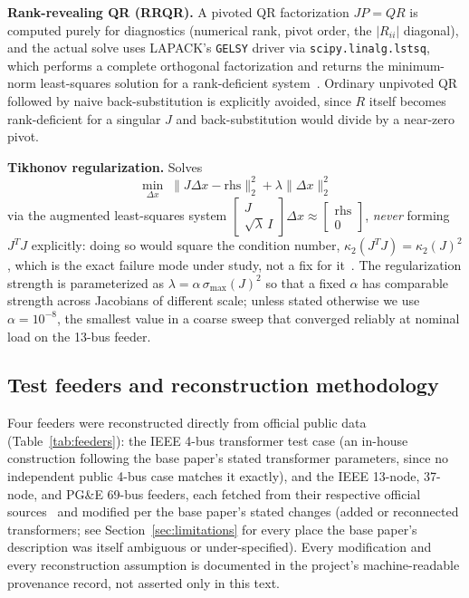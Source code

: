 \documentclass[conference]{IEEEtran}
\begin{document}
\textbf{Rank-revealing QR (RRQR).} A pivoted QR factorization $JP = QR$ is
computed purely for diagnostics (numerical rank, pivot order, the
$|R_{ii}|$ diagonal), and the actual solve uses LAPACK's \texttt{GELSY}
driver via \texttt{scipy.linalg.lstsq}, which performs a complete
orthogonal factorization and returns the minimum-norm least-squares
solution for a rank-deficient system~\cite{chan1987rank}. Ordinary
unpivoted QR followed by naive back-substitution is explicitly avoided,
since $R$ itself becomes rank-deficient for a singular $J$ and
back-substitution would divide by a near-zero pivot.

\textbf{Tikhonov regularization.} Solves
\begin{equation}
\min_{\Delta x} \; \|J\Delta x - \mathrm{rhs}\|_2^2 + \lambda \|\Delta x\|_2^2
\label{eq:tikhonov}
\end{equation}
via the augmented least-squares system
$\left[\begin{smallmatrix} J \\ \sqrt{\lambda}\, I \end{smallmatrix}\right]
\Delta x \approx
\left[\begin{smallmatrix} \mathrm{rhs} \\ 0 \end{smallmatrix}\right]$,
\emph{never} forming $J^{T}J$ explicitly: doing so would square the
condition number, $\kappa_2(J^TJ) = \kappa_2(J)^2$, which is the exact
failure mode under study, not a fix for it~\cite{hansen1998rank}. The
regularization strength is parameterized as $\lambda = \alpha\,
\sigma_{\max}(J)^2$ so that a fixed $\alpha$ has comparable strength across
Jacobians of different scale; unless stated otherwise we use
$\alpha = 10^{-8}$, the smallest value in a coarse sweep that converged
reliably at nominal load on the 13-bus feeder.

\subsection{Test feeders and reconstruction methodology}
\label{sec:feeders}

Four feeders were reconstructed directly from official public data
(Table~\ref{tab:feeders}): the IEEE 4-bus transformer test case (an
in-house construction following the base paper's stated transformer
parameters, since no independent public 4-bus case matches it exactly),
and the IEEE 13-node, 37-node, and PG\&E 69-bus feeders, each fetched from
their respective official sources~\cite{ieeetestfeeders,zimmerman2011matpower,baran1989network}
and modified per the base paper's stated changes (added or reconnected
transformers; see Section~\ref{sec:limitations} for every place the base
paper's description was itself ambiguous or under-specified). Every
modification and every reconstruction assumption is documented in the
project's machine-readable provenance record, not asserted only in this
text.
\end{document}
